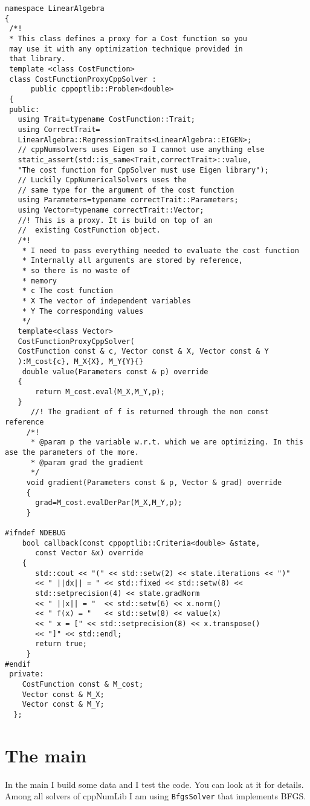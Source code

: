 \documentclass{article}
\newcommand{\li}{\lstinline}
\begin{document}
\begin{lstlisting}[title={CostFunctionProxyCppNumSolver.hpp}]
namespace LinearAlgebra
{
 /*!
 * This class defines a proxy for a Cost function so you
 may use it with any optimization technique provided in
 that library.
 template <class CostFunction>
 class CostFunctionProxyCppSolver :
      public cppoptlib::Problem<double>
 {
 public:
   using Trait=typename CostFunction::Trait;
   using CorrectTrait=
   LinearAlgebra::RegressionTraits<LinearAlgebra::EIGEN>;
   // cppNumsolvers uses Eigen so I cannot use anything else
   static_assert(std::is_same<Trait,correctTrait>::value,
   "The cost function for CppSolver must use Eigen library");
   // Luckily CppNumericalSolvers uses the
   // same type for the argument of the cost function
   using Parameters=typename correctTrait::Parameters;
   using Vector=typename correctTrait::Vector;
   //! This is a proxy. It is build on top of an
   //  existing CostFunction object.
   /*!
    * I need to pass everything needed to evaluate the cost function
    * Internally all arguments are stored by reference,
    * so there is no waste of
    * memory
    * c The cost function
    * X The vector of independent variables
    * Y The corresponding values
    */
   template<class Vector>
   CostFunctionProxyCppSolver(
   CostFunction const & c, Vector const & X, Vector const & Y
   ):M_cost{c}, M_X{X}, M_Y{Y}{}
    double value(Parameters const & p) override
   {
       return M_cost.eval(M_X,M_Y,p);
   }
      //! The gradient of f is returned through the non const reference
     /*!
      * @param p the variable w.r.t. which we are optimizing. In this ase the parameters of the more.
      * @param grad the gradient
      */
     void gradient(Parameters const & p, Vector & grad) override
     {
       grad=M_cost.evalDerPar(M_X,M_Y,p);
     }
     
#ifndef NDEBUG
    bool callback(const cppoptlib::Criteria<double> &state,
       const Vector &x) override
    {
       std::cout << "(" << std::setw(2) << state.iterations << ")"
       << " ||dx|| = " << std::fixed << std::setw(8) <<
       std::setprecision(4) << state.gradNorm
       << " ||x|| = "  << std::setw(6) << x.norm()
       << " f(x) = "   << std::setw(8) << value(x)
       << " x = [" << std::setprecision(8) << x.transpose()
       << "]" << std::endl;
       return true;
     }
#endif
 private:
    CostFunction const & M_cost;
    Vector const & M_X;
    Vector const & M_Y;
  };
\end{lstlisting}
\section{The main}
In the main I build some data and I test the code. You can look at it
for details. Among all solvers of cppNumLib I am using
\li!BfgsSolver! that implements BFGS.
\end{document}
